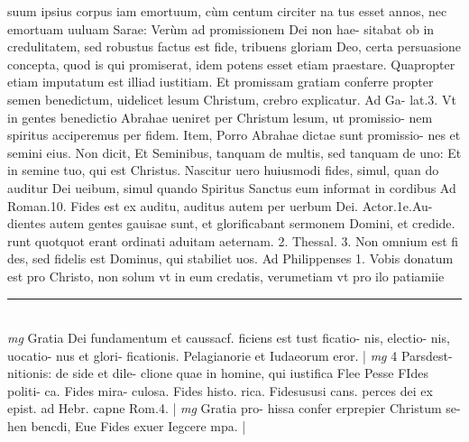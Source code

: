 \documentclass{article}
\begin{document}
\begin{pages}
suum ipsius corpus iam emortuum, cùm centum circiter na tus esset annos, nec emortuam uuluam Sarae: Verùm ad promissionem Dei non hae- sitabat ob in credulitatem, sed robustus factus est fide, tribuens gloriam Deo, certa persuasione concepta, quod is qui promiserat, idem potens esset etiam praestare. Quapropter etiam imputatum est illiad iustitiam. Et promissam gratiam conferre propter semen benedictum, uidelicet lesum Christum, crebro explicatur. Ad Ga- lat.3. Vt in gentes benedictio Abrahae ueniret per Christum lesum, ut promissio- nem spiritus acciperemus per fidem. Item, Porro Abrahae dictae sunt promissio- nes et semini eius. Non dicit, Et Seminibus, tanquam de multis, sed tanquam de uno: Et in semine tuo, qui est Christus. Nascitur uero huiusmodi fides, simul, quan do auditur Dei ueibum, simul quando Spiritus Sanctus eum informat in cordibus Ad Roman.10. Fides est ex auditu, auditus autem per uerbum Dei. Actor.1e.Au- dientes autem gentes gauisae sunt, et glorificabant sermonem Domini, et credide. runt quotquot erant ordinati aduitam aeternam. 2. Thessal. 3. Non omnium est fi des, sed fidelis est Dominus, qui stabiliet uos. Ad Philippenses 1. Vobis donatum est pro Christo, non solum vt in eum credatis, verumetiam vt pro ilo patiamiie  \pend
\vspace{0.5cm}\noindent
\vspace{0.2cm}\rule{1cm}{0.2pt}\\ 
\hspace{0.2cm}\textit{mg}
\footnotesize Gratia Dei fundamentum et caussacf. ficiens est tust ficatio- nis, electio- nis, uocatio- nus et glori- ficationis. Pelagianorie et Iudaeorum eror. 
\normalsize| 
\hspace{0.2cm}\textit{mg}
\footnotesize 4 Parsdest- nitionis: de side et dile- clione quae in homine, qui iustifica Flee Pesse FIdes politi- ca. Fides mira- culosa. Fides histo. rica. Fidesususi cans. perces dei ex epist. ad Hebr. capne Rom.4. 
\normalsize| 
\hspace{0.2cm}\textit{mg}
\footnotesize Gratia pro- hissa confer erprepier Christum se- hen bencdi, Eue Fides exuer Iegcere mpa. 
\normalsize| 

\end{pages}
\end{document}
